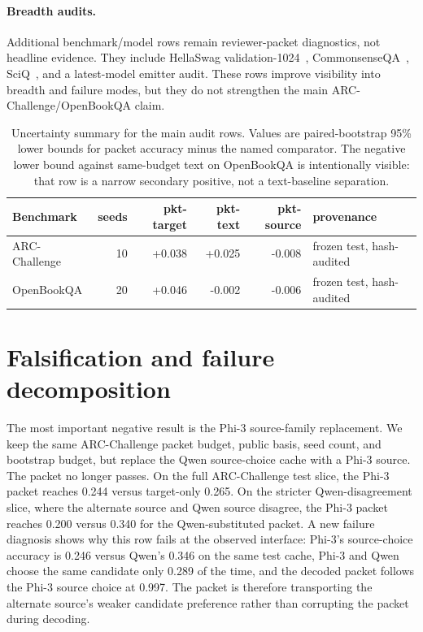 \documentclass{article}
\newcommand{\arc}{ARC-Challenge}
\newcommand{\obqa}{OpenBookQA}
\begin{document}
\paragraph{Breadth audits.}
Additional benchmark/model rows remain reviewer-packet diagnostics, not headline evidence. They include HellaSwag validation-1024~\citep{Zellers2019HellaSwag}, CommonsenseQA~\citep{Talmor2019CommonsenseQA}, SciQ~\citep{Welbl2017SciQ}, and a latest-model emitter audit. These rows improve visibility into breadth and failure modes, but they do not strengthen the main \arc{}/\obqa{} claim.

\begin{table}[t]
  \centering
  \scriptsize
  \setlength{\tabcolsep}{4pt}
  \begin{tabular}{lrrrrl}
    \toprule
    Benchmark & seeds & pkt-target & pkt-text & pkt-source & provenance \\
    \midrule
    \arc{} & 10 & +0.038 & +0.025 & -0.008 & frozen test, hash-audited \\
    \obqa{} & 20 & +0.046 & -0.002 & -0.006 & frozen test, hash-audited \\
    \bottomrule
  \end{tabular}
  \caption{Uncertainty summary for the main audit rows. Values are paired-bootstrap 95\% lower bounds for packet accuracy minus the named comparator. The negative lower bound against same-budget text on \obqa{} is intentionally visible: that row is a narrow secondary positive, not a text-baseline separation.}
  \label{tab:uncertainty}
\end{table}

\section{Falsification and failure decomposition}

The most important negative result is the Phi-3 source-family replacement. We keep the same \arc{} packet budget, public basis, seed count, and bootstrap budget, but replace the Qwen source-choice cache with a Phi-3 source. The packet no longer passes. On the full \arc{} test slice, the Phi-3 packet reaches 0.244 versus target-only 0.265. On the stricter Qwen-disagreement slice, where the alternate source and Qwen source disagree, the Phi-3 packet reaches 0.200 versus 0.340 for the Qwen-substituted packet. A new failure diagnosis shows why this row fails at the observed interface: Phi-3's source-choice accuracy is 0.246 versus Qwen's 0.346 on the same test cache, Phi-3 and Qwen choose the same candidate only 0.289 of the time, and the decoded packet follows the Phi-3 source choice at 0.997. The packet is therefore transporting the alternate source's weaker candidate preference rather than corrupting the packet during decoding.
\end{document}
